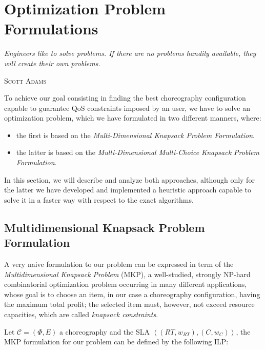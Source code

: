 \documentclass[12pt,a4paper]{report}
\begin{document}
\chapter{Optimization Problem Formulations}\label{chapterOptimizationProble}
\epigraph{\itshape Engineers like to solve problems. If there are no problems handily available, they will create their own problems.}{\textsc{Scott Adams}}

To achieve our goal consisting in finding the best choreography configuration capable to guarantee QoS constraints imposed by an user, we have to solve an optimization problem, which we have formulated in two  different manners, where:

\begin{itemize}
	\item the first is based on the \textit{Multi-Dimensional Knapsack Problem Formulation}.
	\item the latter is based on the \textit{Multi-Dimensional Multi-Choice Knapsack Problem Formulation}. 
\end{itemize}

In this section, we will describe and analyze both approaches, although only for the latter we have developed and implemented a heuristic approach capable to solve it in a faster way with respect to the exact algorithms. 

\section{Multidimensional Knapsack Problem Formulation}

A very naive formulation to our problem can be expressed in term of the \textit{Multidimensional Knapsack Problem} (MKP), a well-studied, strongly NP-hard combinatorial optimization problem occurring in many different applications, whose goal is to choose an item, in our case a choreography configuration, having the maximum total profit; the selected item must, however, not exceed resource capacities, which are called \textit{knapsack constraints}.

Let $\mathcal{C} = (\Phi,E)$ a choreography and the SLA $\left\langle (RT,w_{RT}),(C,w_{C}) \right\rangle$, the MKP formulation for our problem can be defined by the following ILP:
\end{document}
